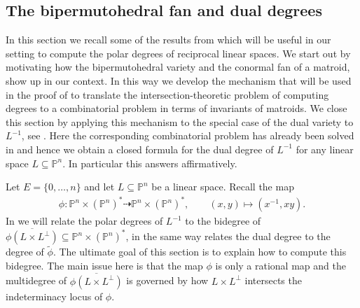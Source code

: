 \documentclass[12pt,a4paper,english]{scrartcl}
\newcommand{\PP}{\mathbb{P}}
\begin{document}
\subsection{The bipermutohedral fan and dual degrees}

In this section we recall some of the results from \cite{Ardila2022} which will be useful in our setting to compute the polar degrees of reciprocal linear spaces. We start out by motivating how the bipermutohedral variety and the conormal fan of a matroid, show up in our context. In this way we develop the mechanism that will be used in the proof of  to translate the intersection-theoretic problem of computing degrees to a combinatorial problem in terms of invariants of matroids.
We close this section by applying this mechanism to the special case of the dual variety to $L^{-1}$, see . Here the corresponding combinatorial problem has already been solved in \cite{Ardila2022} and hence we obtain a closed formula for the dual degree of $L^{-1}$ for any linear space $L\subseteq \PP^n$. In particular this answers  affirmatively.

Let $E=\{0,\ldots,n\}$ and let $L\subseteq \PP^n$ be a linear space. Recall the map \begin{align*}
        \phi\colon\PP^n \times (\PP^n)^* \dashrightarrow\PP^n \times (\PP^n)^*, \qquad (x,y)\mapsto (x^{-1},xy).
\end{align*}
In  we will relate the polar degrees of $L^{-1}$ to the bidegree of $\overline{\phi(L\times L^\perp)}\subseteq \PP^n \times (\PP^n)^*$, in the same way  relates the dual degree to the degree of $\widetilde{\phi}$. The ultimate goal of this section is to explain how to compute this bidegree. The main issue here is that the map $\phi$ is only a rational map and the multidegree of $\overline{\phi(L\times L^\perp)}$ is governed by how $L\times L^\perp$ intersects the indeterminacy locus of $\phi$. %
\end{document}
